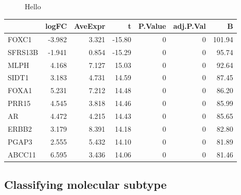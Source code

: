 \documentclass[10pt,twocolumn]{article}\usepackage[]{graphicx}\usepackage[]{color}
\newenvironment{knitrout}{}{} %
\begin{document}
\begin{knitrout}
\begin{figure}[ht]
{}

\caption[Hello]{Hello}\label{fig:unnamed-chunk-32}
\end{figure}


\begin{tabular}{lrrrrrr}
\toprule
  & logFC & AveExpr & t & P.Value & adj.P.Val & B\\
\midrule
FOXC1 & -3.982 & 3.321 & -15.80 & 0 & 0 & 101.94\\
SFRS13B & -1.941 & 0.854 & -15.29 & 0 & 0 & 95.74\\
MLPH & 4.168 & 7.127 & 15.03 & 0 & 0 & 92.64\\
SIDT1 & 3.183 & 4.731 & 14.59 & 0 & 0 & 87.45\\
FOXA1 & 5.231 & 7.212 & 14.48 & 0 & 0 & 86.20\\
\addlinespace
PRR15 & 4.545 & 3.818 & 14.46 & 0 & 0 & 85.99\\
AR & 4.472 & 4.215 & 14.43 & 0 & 0 & 85.65\\
ERBB2 & 3.179 & 8.391 & 14.18 & 0 & 0 & 82.80\\
PGAP3 & 2.555 & 5.432 & 14.10 & 0 & 0 & 81.89\\
ABCC11 & 6.595 & 3.436 & 14.06 & 0 & 0 & 81.46\\
\bottomrule
\end{tabular}


\end{knitrout}

\subsection{Classifying molecular subtype} %
\end{document}
